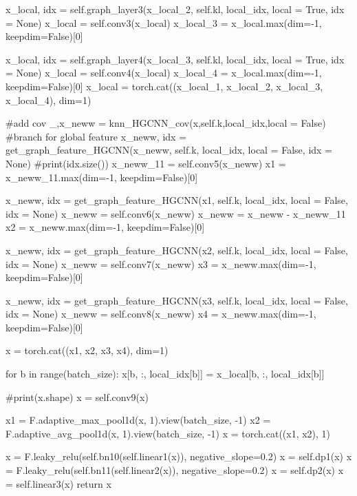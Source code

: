         x_local, idx = self.graph_layer3(x_local_2, self.kl, local_idx, local = True, idx = None)
        x_local = self.conv3(x_local)
        x_local_3 = x_local.max(dim=-1, keepdim=False)[0]

        x_local, idx = self.graph_layer4(x_local_3, self.kl, local_idx, local = True, idx = None)
        x_local = self.conv4(x_local)
        x_local_4 = x_local.max(dim=-1, keepdim=False)[0]
        x_local = torch.cat((x_local_1, x_local_2, x_local_3, x_local_4), dim=1)      
       
        
        #add cov
        _,x_neww = knn_HGCNN_cov(x,self.k,local_idx,local = False)
        #branch for global feature
        x_neww, idx = get_graph_feature_HGCNN(x_neww, self.k, local_idx, local = False, idx = None)
        #print(idx.size())
        x_neww_11 = self.conv5(x_neww)
        x1 = x_neww_11.max(dim=-1, keepdim=False)[0]


        x_neww, idx = get_graph_feature_HGCNN(x1, self.k, local_idx, local = False, idx = None)
        x_neww = self.conv6(x_neww)
        x_neww = x_neww - x_neww_11
        x2 = x_neww.max(dim=-1, keepdim=False)[0]

        x_neww, idx = get_graph_feature_HGCNN(x2, self.k, local_idx, local = False, idx = None)
        x_neww = self.conv7(x_neww)
        x3 = x_neww.max(dim=-1, keepdim=False)[0]

        x_neww, idx = get_graph_feature_HGCNN(x3, self.k, local_idx, local = False, idx = None)
        x_neww = self.conv8(x_neww)
        x4 = x_neww.max(dim=-1, keepdim=False)[0]

        x = torch.cat((x1, x2, x3, x4), dim=1)
        
        for b in range(batch_size):
            x[b, :, local_idx[b]] = x_local[b, :, local_idx[b]]
        
        #print(x.shape)
        x = self.conv9(x)
        
        x1 = F.adaptive_max_pool1d(x, 1).view(batch_size, -1)
        x2 = F.adaptive_avg_pool1d(x, 1).view(batch_size, -1)
        x = torch.cat((x1, x2), 1)
        
        
        x = F.leaky_relu(self.bn10(self.linear1(x)), negative_slope=0.2)
        x = self.dp1(x)
        x = F.leaky_relu(self.bn11(self.linear2(x)), negative_slope=0.2)
        x = self.dp2(x)
        x = self.linear3(x)
        return x
